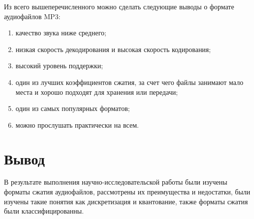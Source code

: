 \documentclass[12pt,a4paper,oneside]{report}
\begin{document}
Из всего вышеперечисленного можно сделать следующие выводы о формате аудиофайлов MP3:
\begin{enumerate}
	\item качество звука ниже среднего;
	\item низкая скорость декодирования и высокая скорость кодирования;
	\item высокий уровень поддержки;
	\item один из лучших коэффициентов сжатия, за счет чего файлы занимают мало места и хорошо подходят для хранения или передачи;
	\item один из самых популярных форматов;
	\item можно прослушать практически на всем.
\end{enumerate}


\chapter*{Вывод}
\qquad 
В результате выполнения научно-исследовательской работы были изучены форматы сжатия аудиофайлов, рассмотрены их преимущества и недостатки, были изучены такие понятия как дискретизация и квантование, также форматы сжатия были классифицированны.
\end{document}
